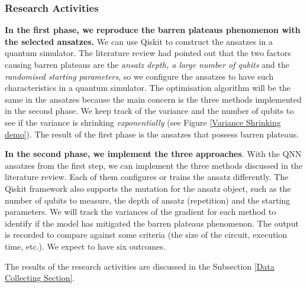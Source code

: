 \subsubsection{Research Activities} \label{Research Activities section}
\textbf{In the first phase, we reproduce the barren plateaus phenomenon with the selected ansatzes.}
We can use Qiskit \cite{Qiskit} to construct the ansatzes in a quantum simulator.
The literature review had pointed out that the two factors causing barren plateaus are the \textit{ansatz depth, a large number of qubits} and the \textit{randomised starting parameters}, so we configure the ansatzes to have such characteristics in a quantum simulator.
The optimisation algorithm will be the same in the ansatzes because the main concern is the three methods implemented in the second phase.
We keep track of the variance and the number of qubits to see if the variance is shrinking  \textit{exponentially} (see Figure \ref{Variance Shrinking demo}).
The result of the first phase is the ansatzes that possess barren plateaus.

\textbf{In the second phase, we implement the three approaches}.
With the QNN ansatzes from the first step, we can implement the three methods discussed in the literature review.
Each of them configures or trains the ansatz differently.
The Qiskit framework also supports the mutation for the ansatz object, such as the number of qubits to measure, the depth of ansatz (repetition) and the starting parameters.
We will track the variances of the gradient for each method to identify if the model has mitigated the barren plateaus phenomenon.
The output is recorded to compare against some criteria (the size of the circuit, execution time, etc.). 
We expect to have six outcomes.

The results of the research activities are discussed in the Subsection \ref{Data Collecting Section}.

